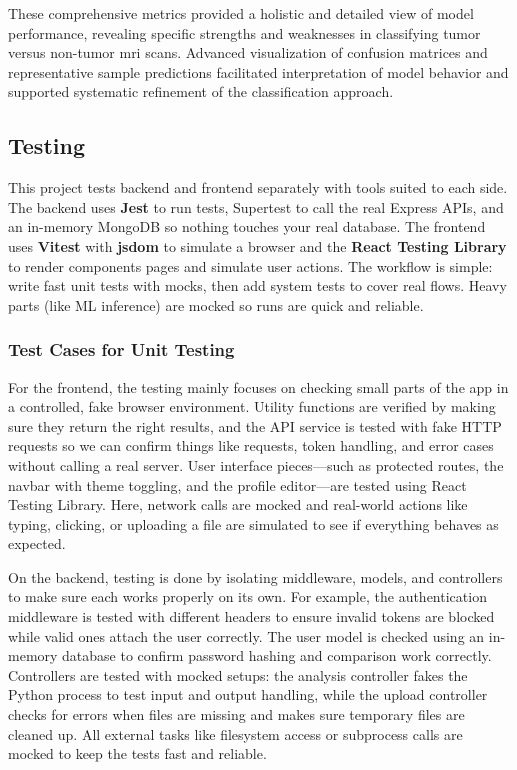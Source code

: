 These comprehensive metrics provided a holistic and detailed view of model
performance, revealing specific strengths and weaknesses in classifying tumor
versus non-tumor \gls{mri} scans. Advanced visualization of confusion matrices
and representative sample predictions facilitated interpretation of model
behavior and supported systematic refinement of the classification approach.


\subsection{Testing}
This project tests backend and frontend separately with tools suited to each
side. The backend uses \textbf{Jest} to run tests, Supertest to call the real
Express APIs, and an in-memory MongoDB so nothing touches your real database.
The frontend uses \textbf{Vitest} with \textbf{jsdom} to simulate a browser and
the \textbf{React Testing Library} to render components pages and simulate user
actions. The workflow is simple: write fast unit tests with mocks, then add
system tests to cover real flows. Heavy parts (like ML inference) are mocked so
runs are quick and reliable.

\subsubsection{Test Cases for Unit Testing}

For the frontend, the testing mainly focuses on checking small parts of the app
in a controlled, fake browser environment. Utility functions are verified by
making sure they return the right results, and the API service is tested with
fake HTTP requests so we can confirm things like requests, token handling, and
error cases without calling a real server. User interface pieces—such as
protected routes, the navbar with theme toggling, and the profile editor—are
tested using React Testing Library. Here, network calls are mocked and
real-world actions like typing, clicking, or uploading a file are simulated to
see if everything behaves as expected.

On the backend, testing is done by isolating middleware, models, and
controllers to make sure each works properly on its own. For example, the
authentication middleware is tested with different headers to ensure invalid
tokens are blocked while valid ones attach the user correctly. The user model
is checked using an in-memory database to confirm password hashing and
comparison work correctly. Controllers are tested with mocked setups: the
analysis controller fakes the Python process to test input and output handling,
while the upload controller checks for errors when files are missing and makes
sure temporary files are cleaned up. All external tasks like filesystem access
or subprocess calls are mocked to keep the tests fast and reliable.

